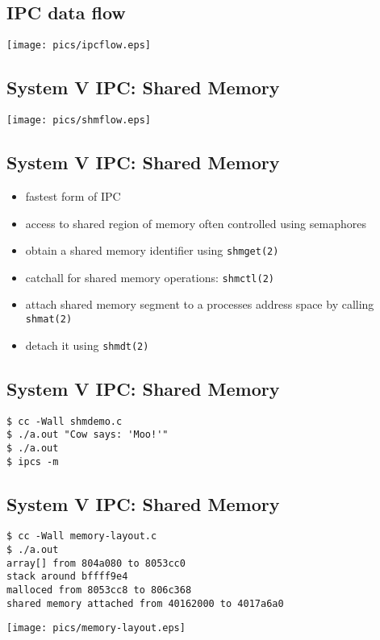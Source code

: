 \documentclass[xga]{xdvislides}
\begin{document}
\subsection{IPC data flow}
\begin{center}
	\texttt{[image: pics/ipcflow.eps]}
\end{center}

\subsection{System V IPC: Shared Memory}

\begin{center}
	\texttt{[image: pics/shmflow.eps]}
\end{center}



\subsection{System V IPC: Shared Memory}
\begin{itemize}
	\item fastest form of IPC
	\item access to shared region of memory often controlled using
		semaphores
	\item obtain a shared memory identifier using {\tt shmget(2)}
	\item catchall for shared memory operations: {\tt shmctl(2)}
	\item attach shared memory segment to a processes address space by
		calling {\tt shmat(2)}
	\item detach it using {\tt shmdt(2)}
\end{itemize}

\subsection{System V IPC: Shared Memory}
\begin{verbatim}
$ cc -Wall shmdemo.c
$ ./a.out "Cow says: 'Moo!'"
$ ./a.out
$ ipcs -m
\end{verbatim}

\subsection{System V IPC: Shared Memory}
\begin{verbatim}
$ cc -Wall memory-layout.c
$ ./a.out
array[] from 804a080 to 8053cc0
stack around bffff9e4
malloced from 8053cc8 to 806c368
shared memory attached from 40162000 to 4017a6a0
\end{verbatim}
\begin{center}
	\texttt{[image: pics/memory-layout.eps]}
\end{center}
\end{document}
